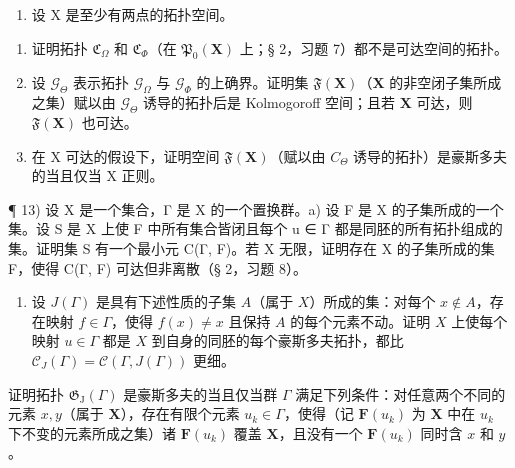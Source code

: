 \begin{enumerate}
\def\labelenumi{\arabic{enumi})}
\setcounter{enumi}{11}
\tightlist
\item
  设 X 是至少有两点的拓扑空间。
\end{enumerate}

\begin{enumerate}
\def\labelenumi{\alph{enumi})}
\item
  证明拓扑 \(\mathfrak{C}_{\Omega}\) 和 \(\mathfrak{C}_{\Phi}\)（在 \(\mathfrak{P}_0(\mathbf{X})\) 上；§ 2，习题 7）都不是可达空间的拓扑。
\item
  设 \(\mathcal{G}_{\Theta}\) 表示拓扑 \(\mathcal{G}_{\Omega}\) 与 \(\mathcal{G}_{\Phi}\) 的上确界。证明集 \(\mathfrak{F}(\mathbf{X})\)（\(\mathbf{X}\) 的非空闭子集所成之集）赋以由 \(\mathcal{G}_{\Theta}\) 诱导的拓扑后是 Kolmogoroff 空间；且若 \(\mathbf{X}\) 可达，则 \(\mathfrak{F}(\mathbf{X})\) 也可达。
\item
  在 X 可达的假设下，证明空间 \(\mathfrak{F}(\mathbf{X})\)（赋以由 \(C_{\Theta}\) 诱导的拓扑）是豪斯多夫的当且仅当 X 正则。
\end{enumerate}

¶ 13) 设 X 是一个集合，Γ 是 X 的一个置换群。a) 设 F 是 X 的子集所成的一个集。设 S 是 X 上使 F 中所有集合皆闭且每个 u ∈ Γ 都是同胚的所有拓扑组成的集。证明集 S 有一个最小元 C(Γ, F)。若 X 无限，证明存在 X 的子集所成的集 F，使得 C(Γ, F) 可达但非离散（§ 2，习题 8）。

\begin{enumerate}
\def\labelenumi{\alph{enumi})}
\setcounter{enumi}{1}
\tightlist
\item
  设 \(J(\Gamma)\) 是具有下述性质的子集 \(A\)（属于 \(X\)）所成的集：对每个 \(x \notin A\)，存在映射 \(f \in \Gamma\)，使得 \(f(x) \neq x\) 且保持 \(A\) 的每个元素不动。证明 \(X\) 上使每个映射 \(u \in \Gamma\) 都是 \(X\) 到自身的同胚的每个豪斯多夫拓扑，都比 \(\mathcal{C}_{J}(\Gamma) = \mathcal{C}(\Gamma, J(\Gamma))\) 更细。
\end{enumerate}

证明拓扑 \(\mathfrak{G}_{\mathrm{J}}(\Gamma)\) 是豪斯多夫的当且仅当群 \(\Gamma\) 满足下列条件：对任意两个不同的元素 \(x, y\)（属于 \(\mathbf{X}\)），存在有限个元素 \(u_{k} \in \Gamma\)，使得（记 \(\mathbf{F}(u_{k})\) 为 \(\mathbf{X}\) 中在 \(u_{k}\) 下不变的元素所成之集）诸 \(\mathbf{F}(u_{k})\) 覆盖 \(\mathbf{X}\)，且没有一个 \(\mathbf{F}(u_{k})\) 同时含 \(x\) 和 \(y\)。

